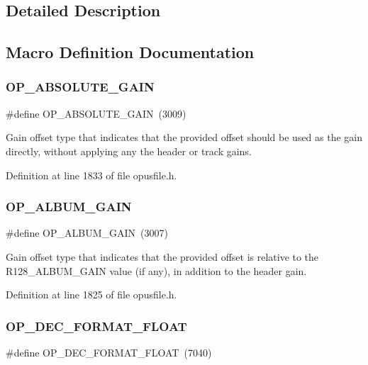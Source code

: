 \subsection{Detailed Description}


\subsection{Macro Definition Documentation}
\mbox{\label{group__stream__decoding_ga4215354abbd19df9eab5a5380dd96cb0}} 
\subsubsection{\texorpdfstring{OP\_ABSOLUTE\_GAIN}{OP\_ABSOLUTE\_GAIN}}
{\footnotesize\ttfamily \#define O\+P\+\_\+\+A\+B\+S\+O\+L\+U\+T\+E\+\_\+\+G\+A\+IN~(3009)}

Gain offset type that indicates that the provided offset should be used as the gain directly, without applying any the header or track gains. 

Definition at line 1833 of file opusfile.\+h.

\mbox{\label{group__stream__decoding_ga72d2506ae978f7dbd3a6a59c57f21036}} 
\subsubsection{\texorpdfstring{OP\_ALBUM\_GAIN}{OP\_ALBUM\_GAIN}}
{\footnotesize\ttfamily \#define O\+P\+\_\+\+A\+L\+B\+U\+M\+\_\+\+G\+A\+IN~(3007)}

Gain offset type that indicates that the provided offset is relative to the R128\+\_\+\+A\+L\+B\+U\+M\+\_\+\+G\+A\+IN value (if any), in addition to the header gain. 

Definition at line 1825 of file opusfile.\+h.

\mbox{\label{group__stream__decoding_gac5c6e0837a5d747fd909aff905f5da3f}} 
\subsubsection{\texorpdfstring{OP\_DEC\_FORMAT\_FLOAT}{OP\_DEC\_FORMAT\_FLOAT}}
{\footnotesize\ttfamily \#define O\+P\+\_\+\+D\+E\+C\+\_\+\+F\+O\+R\+M\+A\+T\+\_\+\+F\+L\+O\+AT~(7040)}

